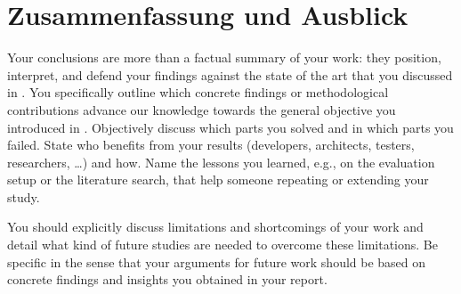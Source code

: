 \documentclass[../thesis-example]{subfiles}
\begin{document}
\chapter{Zusammenfassung und Ausblick}\label{sec:conclusion}

Your conclusions are more than a factual summary of your work: they position, interpret, and defend your findings against the state of the art that you discussed in .
You specifically outline which concrete findings or methodological contributions advance our knowledge towards the general objective you introduced in .
Objectively discuss which parts you solved and in which parts you failed.
State who benefits from your results (developers, architects, testers, researchers, \ldots) and how.
Name the lessons you learned, e.g., on the evaluation setup or the literature search, that help someone repeating or extending your study.

You should explicitly discuss limitations and shortcomings of your work and detail what kind of future studies are needed to overcome these limitations.
Be specific in the sense that your arguments for future work should be based on concrete findings and insights you obtained in your report.
\end{document}
